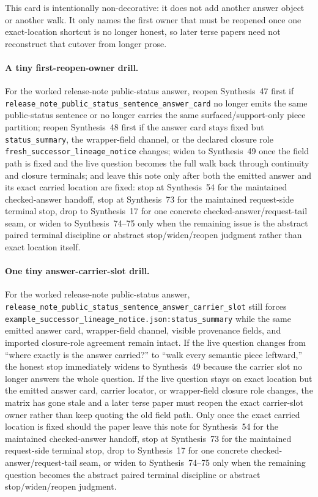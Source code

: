 \documentclass[11pt]{article}
\begin{document}
This card is intentionally non-decorative: it does not add another answer object or another walk. It only names the first owner that must be reopened once one exact-location shortcut is no longer honest, so later terse papers need not reconstruct that cutover from longer prose.\cite{series:challengeanswercards,series:challengeansweraudittrails,series:challengeanswerreviewmenus,series:pairedterminalcitationdiscipline,series:pairedterminalcutoverrules}

\paragraph{A tiny first-reopen-owner drill.}
For the worked release-note public-status answer, reopen Synthesis~47 first if \nolinkurl{release_note_public_status_sentence_answer_card} no longer emits the same public-status sentence or no longer carries the same surfaced/support-only piece partition; reopen Synthesis~48 first if the answer card stays fixed but \nolinkurl{status_summary}, the wrapper-field channel, or the declared closure role \nolinkurl{fresh_successor_lineage_notice} changes; widen to Synthesis~49 once the field path is fixed and the live question becomes the full walk back through continuity and closure terminals; and leave this note only after both the emitted answer and its exact carried location are fixed: stop at Synthesis~54 for the maintained checked-answer handoff, stop at Synthesis~73 for the maintained request-side terminal stop, drop to Synthesis~17 for one concrete checked-answer/request-tail seam, or widen to Synthesis~74--75 only when the remaining issue is the abstract paired terminal discipline or abstract stop/widen/reopen judgment rather than exact location itself.\cite{series:workedexample}

\paragraph{One tiny answer-carrier-slot drill.}
For the worked release-note public-status answer, \nolinkurl{release_note_public_status_sentence_answer_carrier_slot} still forces \nolinkurl{example_successor_lineage_notice.json:status_summary} while the same emitted answer card, wrapper-field channel, visible provenance fields, and imported closure-role agreement remain intact. If the live question changes from ``where exactly is the answer carried?'' to ``walk every semantic piece leftward,'' the honest stop immediately widens to Synthesis~49 because the carrier slot no longer answers the whole question. If the live question stays on exact location but the emitted answer card, carrier locator, or wrapper-field closure role changes, the matrix has gone stale and a later terse paper must reopen the exact carrier-slot owner rather than keep quoting the old field path. Only once the exact carried location is fixed should the paper leave this note for Synthesis~54 for the maintained checked-answer handoff, stop at Synthesis~73 for the maintained request-side terminal stop, drop to Synthesis~17 for one concrete checked-answer/request-tail seam, or widen to Synthesis~74--75 only when the remaining question becomes the abstract paired terminal discipline or abstract stop/widen/reopen judgment.\cite{series:workedexample}
\end{document}
